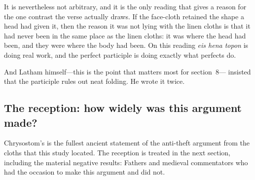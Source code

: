 It is nevertheless not arbitrary, and it is the only reading that gives a
reason for the one contrast the verse actually draws. If the face-cloth
retained the shape a head had given it, then the reason it was not lying with
the linen cloths is that it had never been in the same place as the linen
cloths: it was where the head had been, and they were where the body had been.
On this reading \emph{eis hena topon} is doing real work, and the perfect
participle is doing exactly what perfects do.

And Latham himself---this is the point that matters most for section~8---
insisted that the participle rules out neat folding. He wrote it twice.

\subsection{The reception: how widely was this argument made?}

Chrysostom's is the fullest ancient statement of the anti-theft argument from
the cloths that this study located. The reception is treated in the next
section, including the material negative results: Fathers and medieval
commentators who had the occasion to make this argument and did not.

